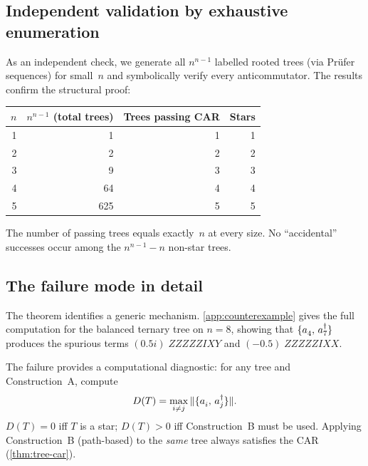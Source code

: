 \subsection{Independent validation by exhaustive enumeration}
\label{sec:st-enumeration}

As an independent check, we generate all $n^{n-1}$ labelled rooted
trees (via Pr\"ufer sequences) for small~$n$ and symbolically verify
every anticommutator.  The results confirm the structural proof:

\begin{center}
\begin{tabular}{@{}rrrr@{}}
\toprule
$n$ & $n^{n-1}$ (total trees) & Trees passing CAR & Stars \\
\midrule
1 &       1 &   1 &   1 \\
2 &       2 &   2 &   2 \\
3 &       9 &   3 &   3 \\
4 &      64 &   4 &   4 \\
5 &     625 &   5 &   5 \\
\bottomrule
\end{tabular}
\end{center}

The number of passing trees equals exactly~$n$ at every size.  No
``accidental'' successes occur among the $n^{n-1} - n$ non-star trees.

\subsection{The failure mode in detail}
\label{sec:st-failure}

The theorem identifies a generic mechanism.
\cref{app:counterexample} gives the full computation for the balanced
ternary tree on $n = 8$, showing that $\acomm{\an{4}}{\ad{7}}$
produces the spurious terms $(0.5i)\;ZZZZZIXY$ and
$(-0.5)\;ZZZZZIXX$.

The failure provides a computational diagnostic: for any tree and
Construction~A, compute
\begin{equation}
  D(T) = \max_{i \neq j} \|\acomm{\an{i}}{\ad{j}}\|.
  \label{eq:diagnostic}
\end{equation}
$D(T) = 0$ iff $T$ is a star; $D(T) > 0$ iff Construction~B must be
used.  Applying Construction~B (path-based) to the \emph{same} tree
always satisfies the CAR (\cref{thm:tree-car}).

